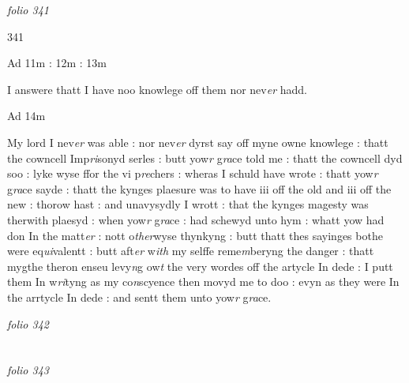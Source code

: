 \documentclass[12pt, a4paper]{book}
\begin{document}
\dotfill
						\newpage
{}

\textit{folio 341}


\begin{flushright}{\color{Mahogany}341}\end{flushright}
 	
		\ifthenelse{\isodd{\thepage}}
		{\reversemarginpar}
		{\normalmarginpar}
		Ad 11m : 12m : 13m


		\ifthenelse{\isodd{\thepage}}
		{\reversemarginpar}
		{\normalmarginpar}
		I answere thatt I have noo knowlege off them nor nev\textit{er} hadd.



 	
	
		\ifthenelse{\isodd{\thepage}}
		{\reversemarginpar}
		{\normalmarginpar}
		Ad 14m
	
		\ifthenelse{\isodd{\thepage}}
		{\reversemarginpar}
		{\normalmarginpar}
		My lord I nev\textit{er} was able : nor nev\textit{er} dyrst say off myne owne 
knowlege : thatt the cowncell Imp\textit{ri}sonyd serles : butt yow\textit{r}
g\textit{ra}ce told me : thatt the cowncell dyd soo : lyke wyse ffor
the vi p\textit{re}chers : wheras I schuld have wrote : thatt yow\textit{r} g\textit{ra}ce
sayde : thatt the kynges plaesure was to have iii off the 
old and iii off the new : thorow hast : and unavysydly
I wrott : that the kynges magesty was therwith plaesyd : when
yow\textit{r} g\textit{ra}ce : had schewyd unto hym : whatt yow had don In 
the matt\textit{er} : nott o\textit{ther}wyse thynkyng : butt thatt thes sayinges 
bothe were eq\textit{ui}valentt : butt aft\textit{er} w\textit{ith} my selffe reme\textit{m}beryng the
danger : thatt mygthe theron enseu levy\textit{n}g ow\textit{t} the very
wordes off the artycle In dede : I putt them In w\textit{ri}tyng
as my co\textit{n}scyence then movyd me to doo : evyn as they were
In the arrtycle In dede : and sentt them unto yow\textit{r} g\textit{ra}ce.

\dotfill
						\newpage
{}

\textit{folio 342}


         \vspace*{4cm}
         
\dotfill
						  \section*{}

\textit{folio 343}
\end{document}
